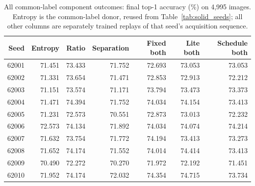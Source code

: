 \documentclass[10pt,a4paper,twocolumn]{article}
\begin{document}
\begin{table}[tbp]
\caption{All common-label component outcomes: final top-1 accuracy
(\%) on 4,995 images. Entropy is the common-label donor, reused from
Table~\ref{tab:solid_seeds}; all other columns are separately trained
replays of that seed's acquisition sequence.}
\label{tab:solid_replay_seeds}
\centering\small
\begin{tabular*}{\textwidth}{@{\extracolsep{\fill}}rrrrrrr@{}}
\toprule
Seed & Entropy & Ratio & Separation & Fixed both & Lite both & Schedule both \\
\midrule
62001 & 71.451 & 73.433 & 71.752 & 72.693 & 73.053 & 73.053 \\
62002 & 71.331 & 73.654 & 71.471 & 72.853 & 72.913 & 72.212 \\
62003 & 71.151 & 73.574 & 71.171 & 73.794 & 73.473 & 73.373 \\
62004 & 71.471 & 74.394 & 71.752 & 74.034 & 74.154 & 73.413 \\
62005 & 71.231 & 72.573 & 70.551 & 72.873 & 73.013 & 72.232 \\
62006 & 72.573 & 74.134 & 71.892 & 74.034 & 74.074 & 74.214 \\
62007 & 71.632 & 73.754 & 71.772 & 74.194 & 73.413 & 73.273 \\
62008 & 71.652 & 74.174 & 71.552 & 74.014 & 74.414 & 73.413 \\
62009 & 70.490 & 72.272 & 70.270 & 71.972 & 72.192 & 71.451 \\
62010 & 71.952 & 74.174 & 72.032 & 74.354 & 74.715 & 73.734 \\
\bottomrule
\end{tabular*}
\end{table}
\end{document}
